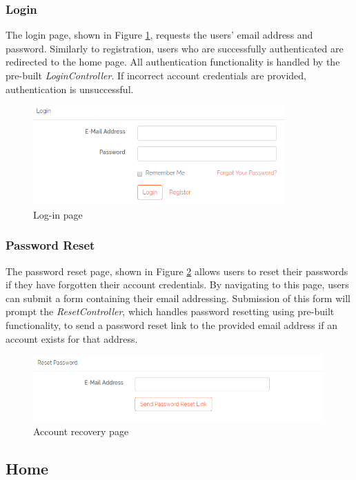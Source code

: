 \subsubsection{Login}
The login page, shown in Figure \ref{fig:LoginPage}, requests the users' email address and password. Similarly to registration, users who are successfully authenticated are redirected to the home page. All authentication functionality is handled by the pre-built \textit{LoginController}. If incorrect account credentials are provided, authentication is unsuccessful.

\begin{figure}[H]
\centering
\includegraphics[height=1.5in]{Images/Design/login-page}
\caption{Log-in page}
\label{fig:LoginPage}
\end{figure}

\subsubsection{Password Reset}
The password reset page, shown in Figure \ref{fig:PasswordReset} allows users to reset their passwords if they have forgotten their account credentials. By navigating to this page, users can submit a form containing their email addressing. Submission of this form will prompt the \textit{ResetController}, which handles password resetting using pre-built functionality, to send a password reset link to the provided email address if an account exists for that address.

\begin{figure}[H]
\centering
\includegraphics[height=1in]{Images/Implementation/PasswordReset}
\caption{Account recovery page}
\label{fig:PasswordReset}
\end{figure}

\subsection{Home}
